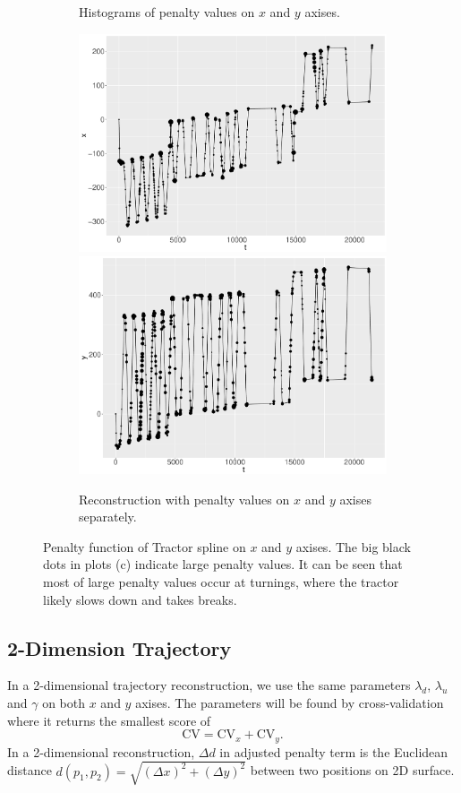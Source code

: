 \begin{figure}
\begin{subfigure}{\textwidth}
    \caption{Histograms of penalty values on $x$ and $y$ axises.}
    \end{subfigure}
    \begin{subfigure}{\textwidth}
    \centering
    \includegraphics[width=0.45\linewidth]{Chapters/02TractorSplineTheory/plot/ggplot/ggRealdataXPenaltyPath.pdf}
    \includegraphics[width=0.45\linewidth]{Chapters/02TractorSplineTheory/plot/ggplot/ggRealdataYPenaltyPath.pdf}
    \caption{Reconstruction with penalty values on $x$ and $y$ axises separately.}
    \end{subfigure}
 \caption{Penalty function of Tractor spline on $x$ and $y$ axises. The big black dots in plots (c) indicate large penalty values. It can be seen that most of large penalty values occur at turnings, where the tractor likely slows down and takes breaks. }\label{penaltyxygg}
 \end{figure}


\subsection{2-Dimension Trajectory}

In a 2-dimensional trajectory reconstruction, we use the same parameters $\lambda_d$, $\lambda_u$ and $\gamma$ on both $x$ and $y$ axises. The parameters will be found by cross-validation where it returns the smallest score of
\begin{equation}
\mbox{CV}=\mbox{CV}_x+\mbox{CV}_y.
\end{equation}
In a 2-dimensional reconstruction, $\Delta d$ in adjusted penalty term is the Euclidean distance $d(p_1,p_2)=\sqrt{(\Delta x)^2+(\Delta y)^2}$ between two positions on 2D surface.

